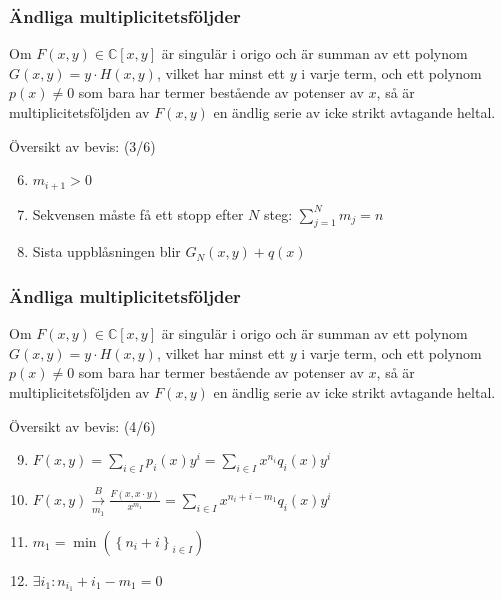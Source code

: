 \documentclass{beamer}
\begin{document}
\begin{frame}
	\frametitle{Ändliga multiplicitetsföljder}
	\begin{Theorem}
		Om $F(x,y)\in \mathbb{C}[x,y]$ är singulär i origo och är summan av ett polynom $G(x,y)=y\cdot H(x,y)$, vilket har minst ett $y$ i varje term, och ett polynom $p(x) \neq 0$ som bara har termer bestående av potenser av $x$, så är multiplicitetsföljden av $F(x,y)$ en ändlig serie av icke strikt avtagande heltal.
	\end{Theorem}
	
	Översikt av bevis: (3/6)
	\begin{enumerate}
		\setcounter{enumi}{5}
		\item $m_{i+1}>0$
		\item<2-> Sekvensen måste få ett stopp efter $N$ steg: $\sum_{j=1}^{N}m_j=n$
		\item<3-> Sista uppblåsningen blir $G_N(x,y)+q(x)$
	\end{enumerate}
\end{frame}

\begin{frame}
	\frametitle{Ändliga multiplicitetsföljder}
	\begin{Theorem}
		Om $F(x,y)\in \mathbb{C}[x,y]$ är singulär i origo och är summan av ett polynom $G(x,y)=y\cdot H(x,y)$, vilket har minst ett $y$ i varje term, och ett polynom $p(x) \neq 0$ som bara har termer bestående av potenser av $x$, så är multiplicitetsföljden av $F(x,y)$ en ändlig serie av icke strikt avtagande heltal.
	\end{Theorem}
	
	Översikt av bevis: (4/6)
	\begin{enumerate}
		\setcounter{enumi}{8}
		\item $F(x,y) = \sum_{i\in I} p_i(x)y^i = \sum_{i\in I} x^{n_i}q_i(x)y^i$
		\item<2-> $F(x,y) \overset{B}{\underset{m_1}{\longrightarrow}} \frac{F(x,x\cdot y)}{x^{m_1}}=\sum_{i\in I} x^{n_i+i-m_1}q_i(x)y^i$
		\item<3-> $m_1=\min(\left\{n_i+i\right\}_{i\in I})$
		\item<4-> $\exists i_1:n_{i_1}+i_1-m_1=0$
	\end{enumerate}
\end{frame}
\end{document}
